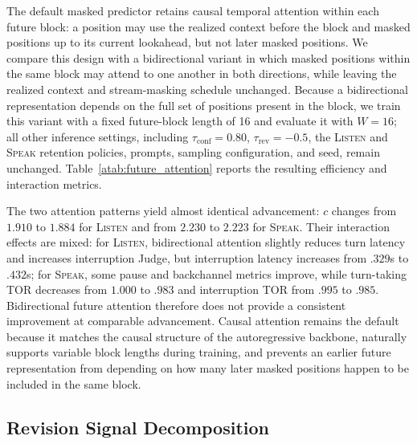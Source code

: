 The default masked predictor retains causal temporal attention within each future block: a position may use the realized context before the block and masked positions up to its current lookahead, but not later masked positions.
We compare this design with a bidirectional variant in which masked positions within the same block may attend to one another in both directions, while leaving the realized context and stream-masking schedule unchanged.
Because a bidirectional representation depends on the full set of positions present in the block, we train this variant with a fixed future-block length of 16 and evaluate it with $W=16$; all other inference settings, including $\tau_{\mathrm{conf}}=0.80$, $\tau_{\mathrm{rev}}=-0.5$, the \textsc{Listen} and \textsc{Speak} retention policies, prompts, sampling configuration, and seed, remain unchanged.
Table~\ref{atab:future_attention} reports the resulting efficiency and interaction metrics.

The two attention patterns yield almost identical advancement: $c$ changes from $1.910$ to $1.884$ for \textsc{Listen} and from $2.230$ to $2.223$ for \textsc{Speak}.
Their interaction effects are mixed: for \textsc{Listen}, bidirectional attention slightly reduces turn latency and increases interruption Judge, but interruption latency increases from $.329$s to $.432$s; for \textsc{Speak}, some pause and backchannel metrics improve, while turn-taking TOR decreases from $1.000$ to $.983$ and interruption TOR from $.995$ to $.985$.
Bidirectional future attention therefore does not provide a consistent improvement at comparable advancement.
Causal attention remains the default because it matches the causal structure of the autoregressive backbone, naturally supports variable block lengths during training, and prevents an earlier future representation from depending on how many later masked positions happen to be included in the same block.


\subsection{Revision Signal Decomposition}
\label{asubsec:revision_decomposition}

